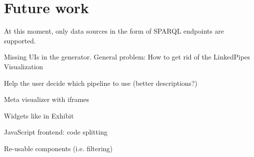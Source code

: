 \chapter{Future work}

At this moment, only data sources in the form of SPARQL endpoints are supported.

Missing UIs in the generator. General problem: How to get rid of the LinkedPipes Visualization

Help the user decide which pipeline to use (better descriptions?)

Meta visualizer with iframes

Widgets like in Exhibit

JavaScript frontend: code splitting

Re-usable components (i.e. filtering)